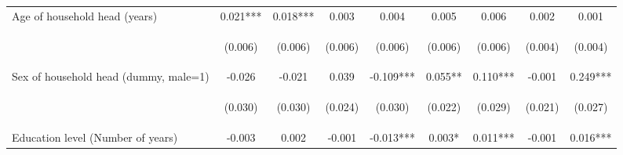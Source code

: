\begin{center}
\begin{tabular}{lcccccccc}
Age of household head (years) & 0.021*** & 0.018*** & 0.003 & 0.004 & 0.005 & 0.006 & 0.002 & 0.001 \\
\vspace{4pt} & \begin{footnotesize}(0.006)\end{footnotesize} & \begin{footnotesize}(0.006)\end{footnotesize} & \begin{footnotesize}(0.006)\end{footnotesize} & \begin{footnotesize}(0.006)\end{footnotesize} & \begin{footnotesize}(0.006)\end{footnotesize} & \begin{footnotesize}(0.006)\end{footnotesize} & \begin{footnotesize}(0.004)\end{footnotesize} & \begin{footnotesize}(0.004)\end{footnotesize} \\
Sex of household head (dummy, male=1) & -0.026 & -0.021 & 0.039 & -0.109*** & 0.055** & 0.110*** & -0.001 & 0.249*** \\
\vspace{4pt} & \begin{footnotesize}(0.030)\end{footnotesize} & \begin{footnotesize}(0.030)\end{footnotesize} & \begin{footnotesize}(0.024)\end{footnotesize} & \begin{footnotesize}(0.030)\end{footnotesize} & \begin{footnotesize}(0.022)\end{footnotesize} & \begin{footnotesize}(0.029)\end{footnotesize} & \begin{footnotesize}(0.021)\end{footnotesize} & \begin{footnotesize}(0.027)\end{footnotesize} \\
Education level (Number of years) & -0.003 & 0.002 & -0.001 & -0.013*** & 0.003* & 0.011*** & -0.001 & 0.016*** \\

\end{tabular}
\end{center}
